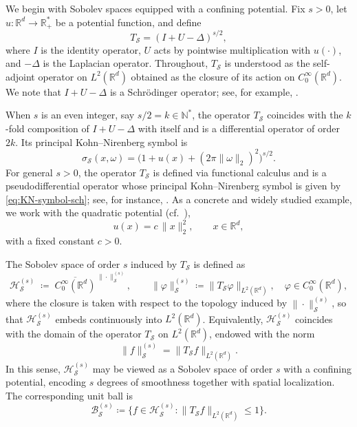 \documentclass[a4paper,12pt]{article}
\newcommand{\N}{\mathbb{N}}
\newcommand{\R}{\mathbb{R}}
\begin{document}
We begin with Sobolev spaces equipped with a confining potential.
Fix $s>0$, let $u\colon\R^d\to\R_+^*$ be a potential function, and define
\begin{equation}\label{eq:introduce-operator-sch}
    T_{\mathcal{S}}
    =
    (I+U-\Delta)^{s/2},
\end{equation}
where $I$ is the identity operator, $U$ acts by pointwise multiplication with $u(\cdot)$,
and $-\Delta$ is the Laplacian operator.
Throughout, $T_{\mathcal{S}}$ is understood as the self-adjoint operator on
$L^2(\R^d)$ obtained as the closure of its action on $C_0^\infty(\R^d)$.
We note that $I+U-\Delta$ is a Schrödinger operator; see, for example,
\cite[Chapter~11.2]{lieb2001analysis}.

When $s$ is an even integer, say $s/2=k\in\N^*$, the operator $T_{\mathcal{S}}$
coincides with the $k$-fold composition of $I+U-\Delta$ with itself and is a
differential operator of order $2k$. Its principal Kohn--Nirenberg symbol is
\begin{equation}\label{eq:KN-symbol-sch}
    \sigma_{\mathcal{S}}(x,\omega)
    =
    \bigl(1+u(x)+(2\pi\|\omega\|_2)^2\bigr)^{s/2}.
\end{equation}
For general $s>0$, the operator $T_{\mathcal{S}}$ is defined via functional
calculus and is a pseudodifferential operator whose principal Kohn--Nirenberg
symbol is given by \eqref{eq:KN-symbol-sch}; see, for instance,
\cite[Definition~3.13]{hinzmicrolocal}. As a concrete and widely studied example, we work with the quadratic
potential (cf.\ \cite[Section~25.3]{shubin_pseudodifferential_2001}),
\[
    u(x)=c\,\|x\|_2^2,
    \qquad x\in\R^d,
\]
with a fixed constant $c>0$.

The Sobolev space of order $s$ induced by $T_{\mathcal{S}}$ is defined as
\[
\mathcal{H}_{\mathcal{S}}^{(s)}
\;\coloneqq\;
\overline{C_0^\infty(\R^d)}^{\,\|\cdot\|_{\mathcal{S}}^{(s)}},
\qquad
\|\varphi\|_{\mathcal{S}}^{(s)}
\coloneqq
\|T_{\mathcal{S}}\varphi\|_{L^2(\R^d)},
\quad \varphi\in C_0^\infty(\R^d),
\]
where the closure is taken with respect to the topology induced by
$\|\cdot\|_{\mathcal{S}}^{(s)}$, so that
$\mathcal{H}_{\mathcal{S}}^{(s)}$ embeds continuously into $L^2(\R^d)$.
Equivalently, $\mathcal{H}_{\mathcal{S}}^{(s)}$ coincides with the domain of the
operator $T_{\mathcal{S}}$ on $L^2(\R^d)$, endowed with the norm
\[
\|f\|_{\mathcal{S}}^{(s)}=\|T_{\mathcal{S}}f\|_{L^2(\R^d)}.
\]
In this sense, $\mathcal{H}_{\mathcal{S}}^{(s)}$ may be viewed as a Sobolev space
of order $s$ with a confining potential, encoding $s$ degrees of smoothness
together with spatial localization.
The corresponding unit ball is
\begin{equation}\label{eq:definition-ballsch}
    \mathcal{B}_{\mathcal{S}}^{(s)}
    \coloneqq
    \bigl\{f\in\mathcal{H}_{\mathcal{S}}^{(s)}:
    \|T_{\mathcal{S}}f\|_{L^2(\R^d)}\le 1\bigr\}.
\end{equation}
\end{document}
